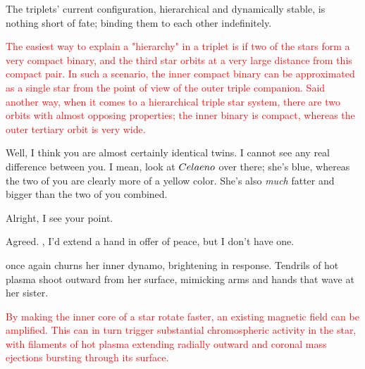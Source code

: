 \documentclass[main.tex]{subfiles}
\begin{document}
\par \nar The triplets' current configuration, hierarchical and dynamically stable, is nothing short of fate; binding them to each other indefinitely.

\begin{tcolorbox}[sharp corners, colback=red!30, colframe=red!80!blue, title=Orbital Hierarchies]
\par \textcolor{red} {The easiest way to explain a "hierarchy" in a triplet is if two of the stars form a very compact binary, and the third star orbits at a very large distance from this compact pair.  In such a scenario, the inner compact binary can be approximated as a single star from the point of view of the outer triple companion.  Said another way, when it comes to a hierarchical triple star system, there are two orbits with almost opposing properties; the inner binary is compact, whereas the outer tertiary orbit is very wide.}
\end{tcolorbox}

\par \Maia Well, I think you are almost certainly identical twins.  I cannot see any real difference between you.  I mean, look at $Celaeno$ over there; she's blue, whereas the two of you are clearly more of a yellow color.  She's also \textit{much} fatter and bigger than the two of you combined.  

\par \Celaeno Alright, I see your point.

\par \Taygete Agreed.  \rmalcyone, I'd extend a hand in offer of peace, but I don't have one.

\par \nar \rmtaygete once again churns her inner dynamo, brightening in response.  Tendrils of hot plasma shoot outward from her surface, mimicking arms and hands that wave at her sister.

\begin{tcolorbox}[sharp corners, colback=red!30, colframe=red!80!blue, title=Magnetic Fields and Dynamos]
\par \textcolor{red} {By making the inner core of a star rotate faster, an existing magnetic field can be amplified.   This can in turn trigger substantial chromospheric activity in the star, with filaments of hot plasma extending radially outward and coronal mass ejections bursting through its surface.}  
\end{tcolorbox}
\end{document}
